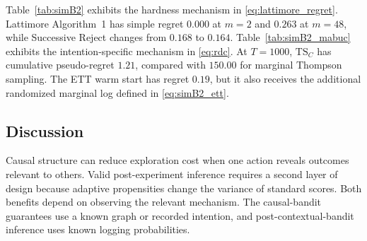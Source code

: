 Table~\ref{tab:simB2} exhibits the hardness mechanism in
\eqref{eq:lattimore_regret}. Lattimore Algorithm~1 has simple regret
$0.000$ at $m=2$ and $0.263$ at $m=48$, while Successive Reject changes
from $0.168$ to $0.164$. Table~\ref{tab:simB2_mabuc} exhibits the
intention-specific mechanism in \eqref{eq:rdc}. At $T=1000$,
$\mathrm{TS}_C$ has cumulative pseudo-regret $1.21$, compared with
$150.00$ for marginal Thompson sampling. The ETT warm start has regret
$0.19$, but it also receives the additional randomized marginal log
defined in \eqref{eq:simB2_ett}.

\FloatBarrier

\subsection{Discussion}
\label{subsec:adaptive_experiments_discussion}

Causal structure can reduce exploration cost when one action reveals outcomes
relevant to others. Valid post-experiment inference requires a second layer of
design because adaptive propensities change the variance of standard scores.
Both benefits depend on observing the relevant mechanism. The causal-bandit
guarantees use a known graph or recorded intention, and post-contextual-bandit
inference uses known logging probabilities.
